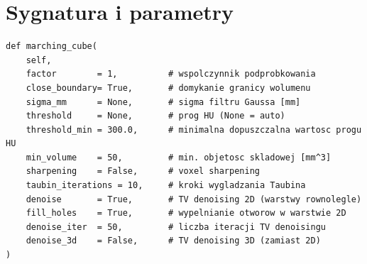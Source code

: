 \documentclass[12pt,a4paper]{article}
\begin{document}
\section{Sygnatura i parametry}

\begin{lstlisting}[style=python, caption={Sygnatura metody \texttt{marching\_cube}}]
def marching_cube(
    self,
    factor        = 1,          # wspolczynnik podprobkowania
    close_boundary= True,       # domykanie granicy wolumenu
    sigma_mm      = None,       # sigma filtru Gaussa [mm]
    threshold     = None,       # prog HU (None = auto)
    threshold_min = 300.0,      # minimalna dopuszczalna wartosc progu HU
    min_volume    = 50,         # min. objetosc skladowej [mm^3]
    sharpening    = False,      # voxel sharpening
    taubin_iterations = 10,     # kroki wygladzania Taubina
    denoise       = True,       # TV denoising 2D (warstwy rownolegle)
    fill_holes    = True,       # wypelnianie otworow w warstwie 2D
    denoise_iter  = 50,         # liczba iteracji TV denoisingu
    denoise_3d    = False,      # TV denoising 3D (zamiast 2D)
)
\end{lstlisting}
\end{document}
